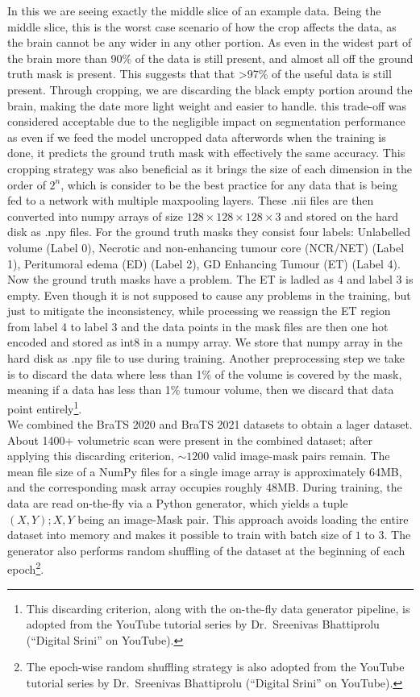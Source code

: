 In this we are seeing exactly the middle slice of an example data. Being the middle slice, this is the worst case scenario of how the crop affects the data, as the brain cannot be any wider in any other portion. As even in the widest part of the brain more than 90\% of the data is still present, and almost all off the ground truth mask is present. This suggests that that >97\% of the useful data is still present. Through cropping, we are discarding the black empty portion around the brain, making the date more light weight and easier to handle. this trade-off was considered acceptable due to the negligible impact on segmentation performance as even if we feed the model uncropped data afterwords when the training is done, it predicts the ground truth mask with effectively the same accuracy. This cropping strategy was also beneficial as it brings the size of each dimension in the order of $2^n$, which is consider to be the best practice for any data that is being fed to a network with multiple maxpooling layers. These .nii files are then converted into numpy arrays of size $128\times128\times128\times3$ and stored on the hard disk as .npy files.
For the ground truth masks they consist four labels: Unlabelled volume (Label 0), Necrotic and non-enhancing tumour core (NCR/NET) (Label 1), Peritumoral edema (ED) (Label 2), GD Enhancing Tumour (ET) (Label 4). Now the ground truth masks have a problem. The ET is ladled as 4 and label 3 is empty. Even though it is not supposed to cause any problems in the training, but just to mitigate the inconsistency, while processing we reassign the ET region from label 4 to label 3 and the data points in the mask files are then one hot encoded and stored as int8 in a numpy array. We store that numpy array in the hard disk as .npy file to use during training.
Another preprocessing step we take is to discard the data where less than 1\% of the volume is covered by the mask, meaning if a data has less than 1\% tumour volume, then we discard that data point entirely\footnote{This discarding criterion, along with the on-the-fly data generator pipeline, is adopted from the YouTube tutorial series by Dr.\ Sreenivas Bhattiprolu (``Digital Srini'' on YouTube).}.
\\
We combined the BraTS 2020 and BraTS 2021 datasets to obtain a lager dataset. About 1400+ volumetric scan were present in the combined dataset; after applying this discarding criterion, $\sim1200$ valid image-mask pairs remain. The mean file size of a NumPy files for a single image array is approximately 64MB, and the corresponding mask array occupies roughly 48MB. During training, the data are read on-the-fly via a Python generator, which yields a tuple $(X,Y); X,Y$ being an image-Mask pair. This approach avoids loading the entire dataset into memory and makes it possible to train with batch size of $1$ to $3$. The generator also performs random shuffling of the dataset at the beginning of each epoch\footnote{The epoch-wise random shuffling strategy is also adopted from the YouTube tutorial series by Dr.\ Sreenivas Bhattiprolu (``Digital Srini'' on YouTube).}.

